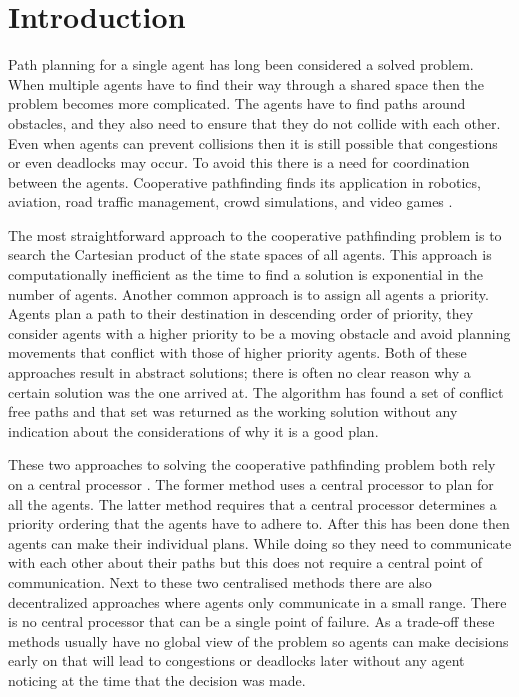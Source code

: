 \section{Introduction}\label{sec:intro}
Path planning for a single agent has long been considered a solved problem.
When multiple agents have to find their way through a shared space then the
problem becomes more complicated. The agents have to find paths around
obstacles, and they also need to ensure that they do not collide with each
other. Even when agents can prevent collisions then it is still possible that
congestions or even deadlocks may occur. To avoid this there is a need for
coordination between the agents. Cooperative pathfinding finds its application
in robotics, aviation, road traffic management, crowd simulations, and video
games \cite{standley2011}.

The most straightforward approach to the cooperative pathfinding problem is to
search the Cartesian product of the state spaces of all agents. This approach
is computationally inefficient \cite{sharon2013} as the time to find a
solution is exponential in the number of agents. Another common approach is to
assign all agents a priority. Agents plan a path to their destination in
descending order of priority, they consider agents with a higher priority to be
a moving obstacle and avoid planning movements that conflict with those of
higher priority agents. Both of these approaches result in abstract solutions;
there is often no clear reason why a certain solution
was the one arrived at. The algorithm has found a set of conflict free paths
and that set was returned as the working solution without any indication about
the considerations of why it is a good plan.

These two approaches to solving the cooperative pathfinding problem both rely
on a central processor \cite{chouhan2017}. The former method uses a central
processor to plan for all the agents. The latter method requires that a central
processor determines a priority ordering that the agents have to adhere to.
After this has been done then agents can make their individual plans. While
doing so they need to communicate with each other about their paths but this
does not require a central
point of communication. Next to these two centralised methods there are also
decentralized approaches where agents only communicate in a small range. There
is no central processor that can be a single point of failure. As a trade-off
these methods usually have no global view of the problem so agents can make
decisions early on that will lead to congestions or deadlocks later without any
agent noticing at the time that the decision was made.

